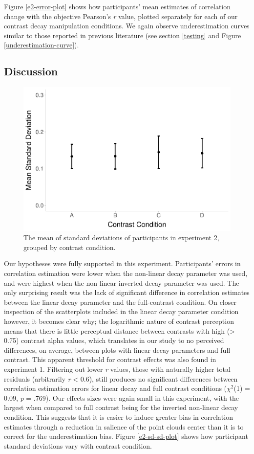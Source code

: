 \documentclass[preprint, 3p,
authoryear]{elsarticle} %
\begin{document}
Figure \ref{e2-error-plot} shows how participants' mean estimates of
correlation change with the objective Pearson's \emph{r} value, plotted
separately for each of our contrast decay manipulation conditions. We
again observe underestimation curves similar to those reported in
previous literature (see section \ref{testing} and Figure
\ref{underestimation-curve}).

\hypertarget{discussion-1}{%
\subsection{Discussion}\label{discussion-1}}

\begin{figure}

\includegraphics[width=0.5\linewidth]{contrast_and_scatterplots_files/figure-latex/e2-sd-sd-plot-1} \hfill{}

\caption{\label{e2-sd-sd-plot}The mean of standard deviations of participants in experiment 2, grouped by contrast condition.}\label{fig:e2-sd-sd-plot}
\end{figure}

Our hypotheses were fully supported in this experiment. Participants'
errors in correlation estimation were lower when the non-linear decay
parameter was used, and were highest when the non-linear inverted decay
parameter was used. The only surprising result was the lack of
significant difference in correlation estimates between the linear decay
parameter and the full-contrast condition. On closer inspection of the
scatterplots included in the linear decay parameter condition however,
it becomes clear why; the logarithmic nature of contrast perception
\citep{varshney_2013, fechner_1948} means that there is little
perceptual distance between contrasts with high (\textgreater{} 0.75)
contrast alpha values, which translates in our study to no perceived
differences, on average, between plots with linear decay parameters and
full contrast. This apparent threshold for contrast effects was also
found in experiment 1. Filtering out lower \emph{r} values, those with
naturally higher total residuals (arbitrarily \emph{r} \textless{} 0.6),
still produces no significant differences between correlation estimation
errors for linear decay and full contrast conditions (\(\chi^2\)(1) =
0.09, \emph{p} = .769). Our effects sizes were again small in this
experiment, with the largest when compared to full contrast being for
the inverted non-linear decay condition. This suggests that it is easier
to induce greater bias in correlation estimates through a reduction in
salience of the point clouds center than it is to correct for the
underestimation bias. Figure \ref{e2-sd-sd-plot} shows how participant
standard deviations vary with contrast condition.
\end{document}
